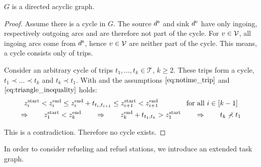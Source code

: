 \begin{lemma}
\label{lem:taskgraph_cyclefree}

$G$ is a directed acyclic graph.

\end{lemma}

\begin{proof}

Assume there is a cycle in $G$. The source $d^{\operatorname{s}}$ and sink $d^{\operatorname{e}}$ have only ingoing, respectively outgoing arcs and are therefore not part of the cycle. For $v\in\mathcal{V}$, all ingoing arcs come from $d^{\operatorname{s}}$, hence $v\in\mathcal{V}$ are neither part of the cycle. This means, a cycle consists only of trips.

Consider an arbitrary cycle of trips $t_1,\dots,t_k\in\mathcal{T}$, $k\geq 2$. These trips form a cycle, \ie ${t_1\prec\dots\prec t_k}$ and ${t_k\prec t_1}$. With  and the assumptions $\eqref{eq:notime_trip}$ and $\eqref{eq:triangle_inequality}$ holds:
\begin{gather*}
	z^{\operatorname{start}}_i < z^{\operatorname{end}}_i \leq z^{\operatorname{end}}_i + t_{t_i,t_{i+1}} \leq z^{\operatorname{start}}_{i+1} < z^{\operatorname{end}}_{i+1} \qquad\qquad \text{for all } i\in[k-1] \\
	\Rightarrow \qquad z^{\operatorname{start}}_1 < z^{\operatorname{end}}_k \qquad \Rightarrow \qquad z^{\operatorname{end}}_k + t_{t_1,t_k} > z^{\operatorname{start}}_1 \qquad \Rightarrow \qquad t_k\not\prec t_1
\end{gather*}

This is a contradiction. Therefore no cycle exists.

\end{proof}

In order to consider refueling and refuel stations, we introduce an extended task graph.

